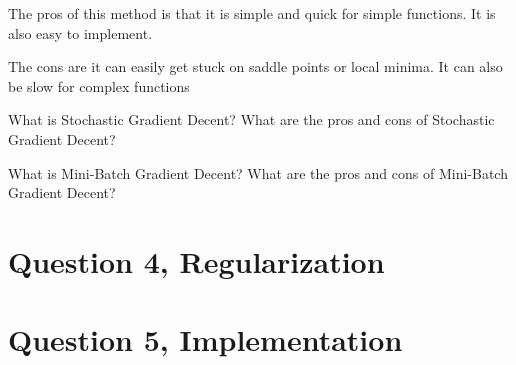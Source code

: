 \documentclass{article}
\begin{document}
The pros of this method is that it is simple and quick for simple functions. It is also easy to implement.

The cons are it can easily get stuck on saddle points or local minima. It can also be slow for complex functions




What is Stochastic Gradient Decent? What are the pros and cons of Stochastic Gradient Decent?

What is Mini-Batch Gradient Decent? What are the pros and cons of Mini-Batch Gradient Decent?


\section*{Question 4, Regularization}


\section*{Question 5, Implementation}
\end{document}

